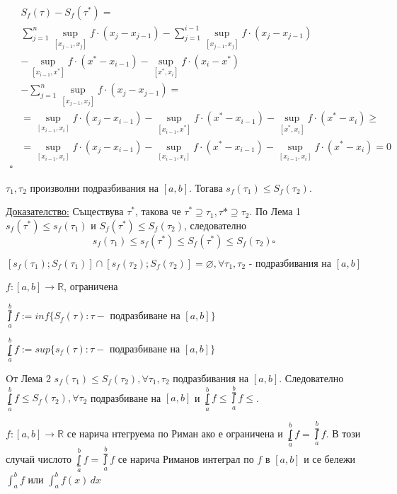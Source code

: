 \documentclass{article}
\newcommand{\tvurdenie}[2]{
    \begin{tcolorbox}[title = #1 ,colframe = blue!70!black, colback = blue!10!white]
        #2
    \end{tcolorbox}
}
\newcommand{\opredelenie}[2]{
    \begin{tcolorbox}[title = #1 ,colframe = red!70!black, colback = red!10!white]
        #2
    \end{tcolorbox}
}
\begin{document}
\begin{equation*}
\begin{split}
                & S_f(\tau)-S_f(\tau^*) = \\
                & \sum_{j=1}^{n}\sup_{[x_{j-1},x_j]}f \cdot (x_j-x_{j-1}) -
                \sum_{j=1}^{i-1}\sup_{[x_{j-1},x_j]}f \cdot (x_j-x_{j-1}) \\
                & - \sup_{[x_{i-1},x^*]}f \cdot (x^*-x_{i-1}) -
                \sup_{[x^*,x_i]}f \cdot (x_i-x^*) \\
                & - \sum_{j=1}^{n}\sup_{[x_{j-1},x_j]}f \cdot (x_j-x_{j-1}) =\\
                & = 
                \sup_{[x_{i-1},x_i]}f \cdot (x_j-x_{i-1})
                - \sup_{[x_{i-1}, x^*]}f \cdot (x^*-x_{i-1}) 
                - \sup_{[x^*,x_i]}f \cdot (x^*-x_i) \ge \\
                & = 
                \sup_{[x_{i-1},x_i]}f \cdot (x_j-x_{i-1})
                - \sup_{[x_{i-1}, x_i]}f \cdot (x^*-x_{i-1}) 
                - \sup_{[x_{i-1},x_i]}f \cdot (x^*-x_i) = 0 \\
                \square
\end{split}
\end{equation*}

\tvurdenie{Лема 2}{
    $\tau_1, \tau_2$ произволни подразбивания на $[a,b]$.
    Тогава $s_f(\tau_1)\leq S_f(\tau_2)$.
}
\underline{Доказателство:} Съществува $\tau^*$, такова че $\tau^*\supseteq \tau_1, \tau*\supseteq \tau_2$.
По Лема 1 $s_f(\tau^*)\leq s_f(\tau_1)$ и $S_f(\tau^*)\leq S_f(\tau_2)$, следователно
\[
    s_f(\tau_1)\leq s_f(\tau^*) \leq S_f(\tau^*) \leq S_f(\tau_2)\square
\]

\[
    [s_f(\tau_1);S_f(\tau_1)]\cap [s_f(\tau_2);S_f(\tau_2)]=\varnothing, \forall\tau_1,\tau_2 \text{ - подразбивания на }[a,b]
\]

$f:[a,b]\rightarrow\mathbb{R}$, ограничена

$\upint\limits_{a}^{b} f := inf\{S_f(\tau): \tau - \text{ подразбиване на }[a,b]\}$

$\lowint\limits_{a}^{b} f := sup\{s_f(\tau): \tau - \text{ подразбиване на }[a,b]\}$

Oт Лема 2 $s_f(\tau_1)\leq S_f(\tau_2), \forall \tau_1,\tau_2$ подразбивания на $[a,b]$. Следователно
$\lowint\limits_{a}^{b} f \leq S_f(\tau_2), \forall \tau_2$ подразбиване на $[a,b]$ и $\lowint\limits_{a}^{b} f \leq \upint\limits_{a}^{b} f \leq$.

\opredelenie{Интегруемост по Риман}{
    $f: [a,b] \to \mathbb{R}$ се нарича нтегруема по Риман ако е ограничена и 
    $\lowint\limits_{a}^{b}f = \upint\limits_{a}^{b}f$. В този случай
    числото $\lowint\limits_{a}^{b}f = \upint\limits_{a}^{b}f$ се нарича
    Риманов интеграл по $f$ в $[a,b]$ и се бележи
    $\int_{a}^{b}f$ или $\int_{a}^{b}f(x)\,dx$
}
\end{document}
